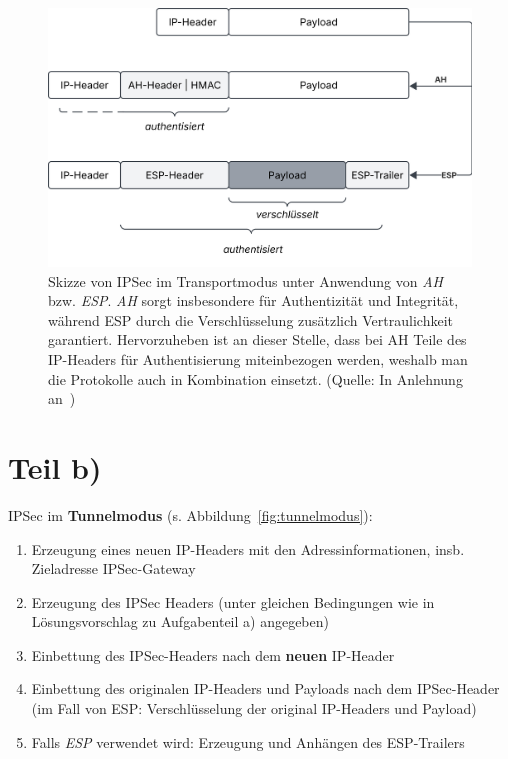 \begin{figure}
    \centering
    \includegraphics[scale=0.4]{aufgabe 3/img/transportmodus.svg}
    \caption{Skizze von IPSec im Transportmodus unter Anwendung von \textit{AH} bzw. \textit{ESP}. \textit{AH} sorgt insbesondere für Authentizität und Integrität, während ESP durch die Verschlüsselung zusätzlich Vertraulichkeit garantiert. Hervorzuheben ist an dieser Stelle, dass bei AH Teile des IP-Headers für Authentisierung miteinbezogen werden, weshalb man die Protokolle auch in Kombination einsetzt. (Quelle: In Anlehnung an~\cite[\textbf{Abb. 3.6}, 41]{ITS4})}
    \label{fig:transportmodus}
\end{figure}

\section{Teil b)}
IPSec im \textbf{Tunnelmodus} (s. Abbildung~\ref{fig:tunnelmodus}):

\begin{enumerate}
    \itemsep0.5em
    \item Erzeugung eines neuen IP-Headers mit den Adressinformationen, insb. Zieladresse IPSec-Gateway
    \item Erzeugung des IPSec Headers (unter gleichen Bedingungen wie in Lösungsvorschlag zu Aufgabenteil a) angegeben)
    \item Einbettung des IPSec-Headers nach dem \textbf{neuen} IP-Header
    \item Einbettung des originalen IP-Headers und Payloads nach dem IPSec-Header (im Fall von ESP: Verschlüsselung der original IP-Headers und Payload)
    \item Falls \textit{ESP} verwendet wird: Erzeugung und Anhängen des ESP-Trailers
\end{enumerate}

